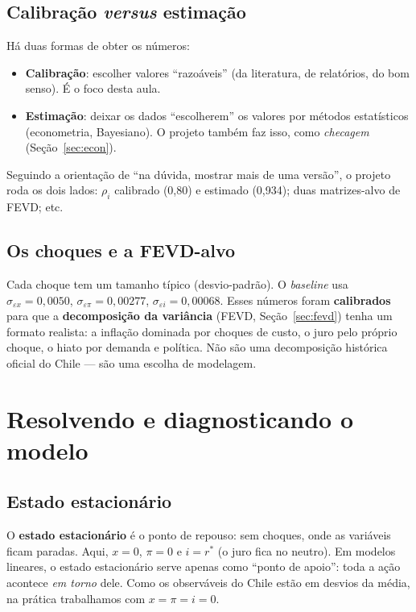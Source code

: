 \documentclass[11pt,a4paper]{article}
\begin{document}
\subsection{Calibração \emph{versus} estimação}
Há duas formas de obter os números:
\begin{itemize}[nosep]
  \item \textbf{Calibração}: escolher valores ``razoáveis'' (da literatura, de relatórios, do bom
        senso). É o foco desta aula.
  \item \textbf{Estimação}: deixar os dados ``escolherem'' os valores por métodos estatísticos
        (econometria, Bayesiano). O projeto também faz isso, como \emph{checagem} (Seção~\ref{sec:econ}).
\end{itemize}
Seguindo a orientação de ``na dúvida, mostrar mais de uma versão'', o projeto roda os dois lados:
$\rho_i$ calibrado (0,80) e estimado (0,934); duas matrizes-alvo de FEVD; etc.

\subsection{Os choques e a FEVD-alvo}
Cada choque tem um tamanho típico (desvio-padrão). O \emph{baseline} usa
$\sigma_{\varepsilon x}=0{,}0050$, $\sigma_{\varepsilon \pi}=0{,}00277$,
$\sigma_{\varepsilon i}=0{,}00068$. Esses números foram \textbf{calibrados} para que a
\textbf{decomposição da variância} (FEVD, Seção~\ref{sec:fevd}) tenha um formato realista: a inflação
dominada por choques de custo, o juro pelo próprio choque, o hiato por demanda e política. Não são uma
decomposição histórica oficial do Chile --- são uma escolha de modelagem.

\section{Resolvendo e diagnosticando o modelo}

\subsection{Estado estacionário}
O \textbf{estado estacionário} é o ponto de repouso: sem choques, onde as variáveis ficam paradas.
Aqui, $x=0$, $\pi=0$ e $i=r^\ast$ (o juro fica no neutro). Em modelos lineares, o estado estacionário
serve apenas como ``ponto de apoio'': toda a ação acontece \emph{em torno} dele. Como os observáveis
do Chile estão em desvios da média, na prática trabalhamos com $x=\pi=i=0$.
\end{document}

